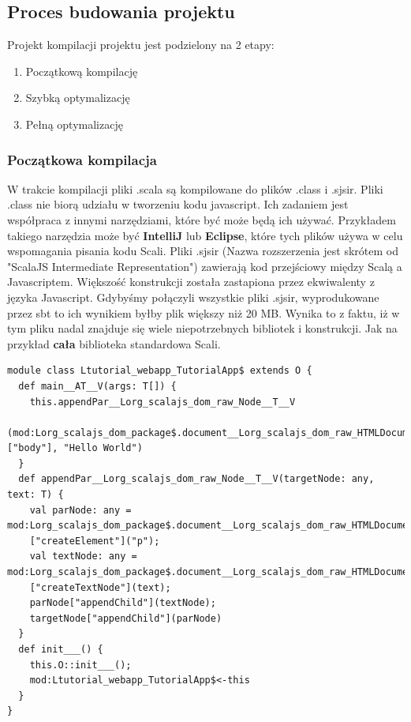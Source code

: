 
\subsection{Proces budowania projektu}

Projekt kompilacji projektu jest podzielony na 2 etapy\cite{HandsOnScalaPipeline}:
\begin{enumerate}
	\item Początkową kompilację
	\item Szybką optymalizację
	\item Pełną optymalizację
\end{enumerate}

\subsubsection{Początkowa kompilacja}

W trakcie kompilacji pliki .scala są kompilowane do plików .class i .sjsir. 
Pliki .class nie biorą udziału w tworzeniu kodu javascript. Ich zadaniem jest współpraca z innymi narzędziami, które być może będą ich używać. Przykładem takiego narzędzia może być \textbf{IntelliJ} lub \textbf{Eclipse}, które tych plików używa w celu wspomagania pisania kodu Scali.
Pliki .sjsir (Nazwa rozszerzenia jest skrótem od "ScalaJS Intermediate Representation")\cite{ScalaCompilationProcess} zawierają kod przejściowy między Scalą a Javascriptem. Większość konstrukcji została zastapiona przez ekwiwalenty z języka Javascript. 
Gdybyśmy połączyli wszystkie pliki .sjsir, wyprodukowane przez sbt to ich wynikiem byłby plik większy niż 20 MB. Wynika to z faktu, iż w tym pliku nadal znajduje się wiele niepotrzebnych bibliotek i konstrukcji. Jak na przykład \textbf{cała} biblioteka standardowa Scali.


\begin{lstlisting}[label={lst:scalasbt},
frame=single, numbers=none,captionpos=b, 
caption={Przykładowy plik .sjsir dla projektu wyświetlającego HelloWorld na ekranie.}]
module class Ltutorial_webapp_TutorialApp$ extends O {
  def main__AT__V(args: T[]) {
    this.appendPar__Lorg_scalajs_dom_raw_Node__T__V
    (mod:Lorg_scalajs_dom_package$.document__Lorg_scalajs_dom_raw_HTMLDocument()["body"], "Hello World")
  }
  def appendPar__Lorg_scalajs_dom_raw_Node__T__V(targetNode: any, text: T) {
    val parNode: any = mod:Lorg_scalajs_dom_package$.document__Lorg_scalajs_dom_raw_HTMLDocument()
    ["createElement"]("p");
    val textNode: any = mod:Lorg_scalajs_dom_package$.document__Lorg_scalajs_dom_raw_HTMLDocument()
    ["createTextNode"](text);
    parNode["appendChild"](textNode);
    targetNode["appendChild"](parNode)
  }
  def init___() {
    this.O::init___();
    mod:Ltutorial_webapp_TutorialApp$<-this
  }
}
\end{lstlisting}

